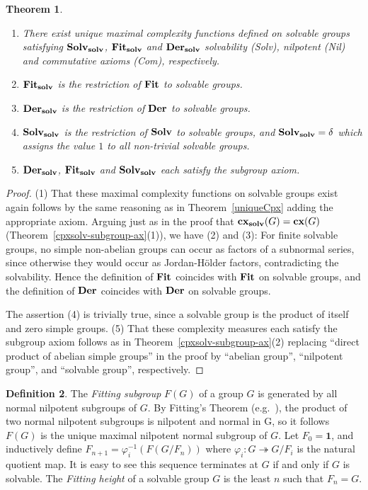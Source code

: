 \documentclass[a4paper,11pt]{amsart}
\newtheorem{theorem}{Theorem}[section]
\theoremstyle{definition}
\newtheorem{definition}[theorem]{Definition}
\newcommand{\cx}{\mbox{\bf cx}}
\newcommand{\Fit}{{\bf Fit}}
\newcommand{\Der}{{\bf Der}}
\newcommand{\Solv}{{\bf Solv}}
\newcommand{\solv}{{\bf solv}}
\newcommand{\sur}{\twoheadrightarrow}
\newcommand{\1}{{\mathbf 1}}
\begin{document}
\begin{theorem}
\begin{enumerate}
\item There exist unique  maximal complexity functions defined on solvable groups satisfying
$\Solv_\solv$, $\Fit_\solv$ and $\Der_\solv$  solvability {\rm (Solv)}, nilpotent {\rm (Nil)} and commutative axioms {\rm (Com)}, respectively.
    \item
$\Fit_\solv$ is the restriction of $\Fit$ to solvable groups.
\item $\Der_\solv$ is the restriction of $\Der$ to solvable groups.
\item $\Solv_\solv$ is the restriction of $\Solv$ to solvable groups, and $\Solv_\solv=\delta$
which assigns the value $1$ to all non-trivial solvable groups. 
\item $\Der_\solv$, $\Fit_\solv$ and $\Solv_\solv$ each satisfy the subgroup axiom. 
\end{enumerate}
\end{theorem}
\begin{proof} 
 (1) That these maximal complexity functions on solvable groups exist again follows by the same reasoning as in Theorem~\ref{uniqueCpx}
 adding the appropriate axiom. Arguing just as in the proof that $\cx_\solv(G)=\cx(G)$ (Theorem~\ref{cpxsolv-subgroup-ax}(1)), we have (2) and (3): For finite solvable groups, no simple non-abelian groups can occur as factors of a subnormal series, since otherwise they would occur as Jordan-H\"{o}lder factors, contradicting the solvability.
Hence the definition of $\Fit$ coincides with $\Fit$ on solvable groups, and the definition of $\Der$ coincides with $\Der$ on solvable groups. 

The assertion (4) is trivially true, since a solvable group is the product of itself and zero simple groups. 
(5) That these complexity measures each satisfy the subgroup axiom follows as in Theorem~\ref{cpxsolv-subgroup-ax}(2) replacing ``direct product of abelian simple groups'' in the proof by ``abelian group'', ``nilpotent group'', and ``solvable group'',  respectively. 
\end{proof} 


\begin{definition}
The {\em Fitting subgroup} $F(G)$ of a group $G$ is generated by all normal nilpotent subgroups of $G$. By Fitting's Theorem (e.g.~\cite[Theorem~5.2.8]{Robinson}), the product of two normal nilpotent subgroups is nilpotent and normal in G, 
so it follows $F(G)$ is the unique maximal nilpotent normal subgroup of $G$. Let $F_0=\1$,
and inductively define $F_{n+1}=\varphi_i^{-1}(F(G/F_n))$ where $\varphi_i: G\sur G/F_i$ is the natural quotient map.
It is easy to see this sequence terminates at $G$ if and only if $G$ is solvable. 
The {\em Fitting height} of a solvable group $G$ is the least $n$ such that $F_n=G$. 
\end{definition}
\end{document}
